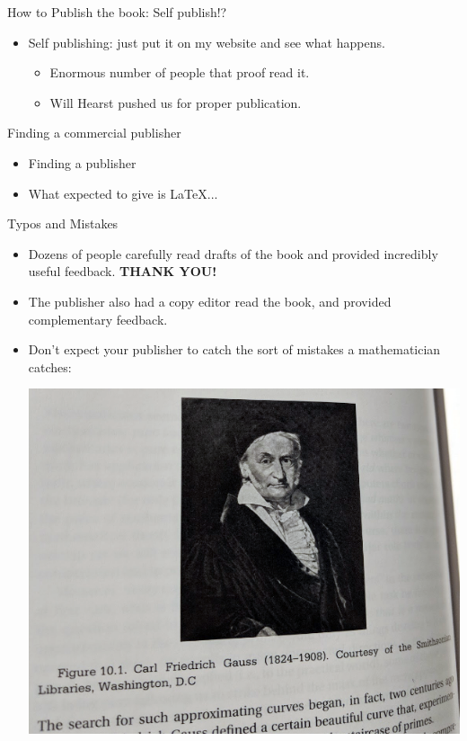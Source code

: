 \documentclass{beamer}
\begin{document}
\begin{frame}{How to Publish the book:  Self publish!?}
  \begin{itemize}
    \item Self publishing: just put it on my website and see what happens.
          \begin{itemize}
            \item Enormous number of people that proof read it.
            \item Will Hearst pushed us for proper publication.
          \end{itemize}
  \end{itemize}
\end{frame}

\begin{frame}{Finding a commercial publisher}
  \begin{itemize}
    \item Finding a publisher
    \item What expected to give is \LaTeX{}...
  \end{itemize}
\end{frame}


\begin{frame}{Typos and Mistakes}
  \begin{itemize}
    \item Dozens of people carefully read drafts of
          the book and provided incredibly useful feedback.
          \textbf{THANK YOU!}
    \item The publisher also had a copy editor read the book,
          and provided complementary feedback.
    \item Don't expect your publisher to catch the sort of
          mistakes a mathematician catches:
          \begin{center}
            \includegraphics[height=.45\textheight]{pics/gauss.png}
          \end{center}
  \end{itemize}
\end{frame}
\end{document}
